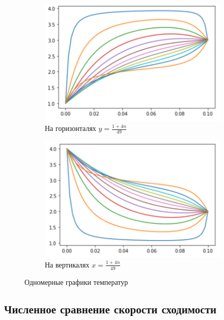 \documentclass[report , a4paper, onecolumn, 12pt]{article}
\begin{document}
\begin{figure}[]
    \centering
    \begin{subfigure}{0.5\textwidth}
    \includegraphics[width=1\textwidth]{profiles_h}
    \caption{На горизонталях $y=\frac{1+4n}{49}$}
    \end{subfigure}%
    \begin{subfigure}{0.5\textwidth}
    \includegraphics[width=1\textwidth]{profiles_v}
    \caption{На вертикалях $x=\frac{1+4n}{49}$}
    \end{subfigure}
    \caption{Одномерные графики температур}
    \label{fig:profiles}
\end{figure}

\subsection{Численное сравнение скорости сходимости}
\end{document}
